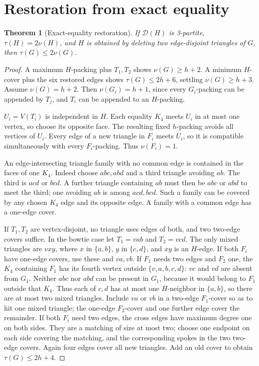 \documentclass[11pt]{article}
\newtheorem{theorem}{Theorem}[section]
\theoremstyle{definition}\newtheorem{definition}[theorem]{Definition}
\theoremstyle{remark}\newtheorem{remark}[theorem]{Remark}
\begin{document}
\section{Restoration from exact equality}\label{sec:exact}
\begin{theorem}[Exact-equality restoration]\label{thm:exact}
If \(\mathcal D(H)\) is 3-partite, \(\tau(H)=2\nu(H)\), and \(H\) is obtained by deleting two edge-disjoint triangles of \(G\), then \(\tau(G)\le 2\nu(G)\).
\end{theorem}
\begin{proof}\leavevmode
A maximum \(H\)-packing plus \(T_1,T_2\) shows \(\nu(G)\ge h+2\). A minimum \(H\)-cover plus the six restored edges shows \(\tau(G)\le 2h+6\), settling \(\nu(G)\ge h+3\). Assume \(\nu(G)=h+2\). Then \(\nu(G_i)=h+1\), since every \(G_i\)-packing can be appended by \(T_j\), and \(T_i\) can be appended to an \(H\)-packing.

\(U_i=V(T_i)\) is independent in \(H\). Each equality \(K_4\) meets \(U_i\) in at most one vertex, so choose its opposite face. The resulting fixed \(h\)-packing avoids all vertices of \(U_i\). Every edge of a new triangle in \(F_i\) meets \(U_i\), so it is compatible simultaneously with every \(F_i\)-packing. Thus \(\nu(F_i)=1\).

An edge-intersecting triangle family with no common edge is contained in the faces of one \(K_4\). Indeed choose \(abc,abd\) and a third triangle avoiding \(ab\). The third is \(acd\) or \(bcd\). A further triangle containing \(ab\) must then be \(abc\) or \(abd\) to meet the third; one avoiding \(ab\) is among \(acd,bcd\). Such a family can be covered by any chosen \(K_4\) edge and its opposite edge. A family with a common edge has a one-edge cover.

If \(T_1,T_2\) are vertex-disjoint, no triangle uses edges of both, and two two-edge covers suffice. In the bowtie case let \(T_1=vab\) and \(T_2=vcd\). The only mixed triangles are \(vxy\), where \(x\) in \(\{a,b\}\), \(y\) in \(\{c,d\}\), and \(xy\) is an \(H\)-edge. If both \(F_i\) have one-edge covers, use these and \(va,vb\). If \(F_1\) needs two edges and \(F_2\) one, the \(K_4\) containing \(F_1\) has its fourth vertex outside \(\{v,a,b,c,d\}\): \(vc\) and \(vd\) are absent from \(G_1\). Neither \(abc\) nor \(abd\) can be present in \(G_1\), because it would belong to \(F_1\) outside that \(K_4\). Thus each of \(c,d\) has at most one \(H\)-neighbor in \(\{a,b\}\), so there are at most two mixed triangles. Include \(va\) or \(vb\) in a two-edge \(F_1\)-cover so as to hit one mixed triangle; the one-edge \(F_2\)-cover and one further edge cover the remainder. If both \(F_i\) need two edges, the cross edges have maximum degree one on both sides. They are a matching of size at most two; choose one endpoint on each side covering the matching, and the corresponding spokes in the two two-edge covers. Again four edges cover all new triangles. Add an old cover to obtain \(\tau(G)\le 2h+4\).
\end{proof}
\end{document}
